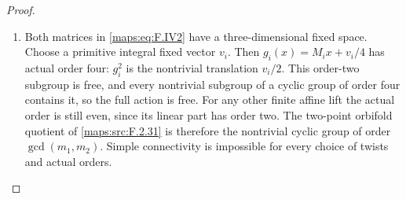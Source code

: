 \begin{proof}
\begin{enumerate}[label=\arabic*.]
\item Both matrices in \eqref{maps:eq:F.IV2} have a three-dimensional fixed
space.  Choose a primitive integral fixed vector $v_i$.
Then $g_i(x)=M_ix+v_i/4$ has actual order four:
$g_i^2$ is the nontrivial translation $v_i/2$.
This order-two subgroup is free, and every nontrivial
subgroup of a cyclic group of order four contains it, so
the full action is free.  For any other finite affine lift
the actual order is still even, since its linear part has
order two.  The two-point orbifold quotient of \ref{maps:src:F.2.31} is
therefore the nontrivial cyclic group of order
$\gcd(m_1,m_2)$.  Simple connectivity is impossible for
every choice of twists and actual orders.

\end{enumerate}
\end{proof}




